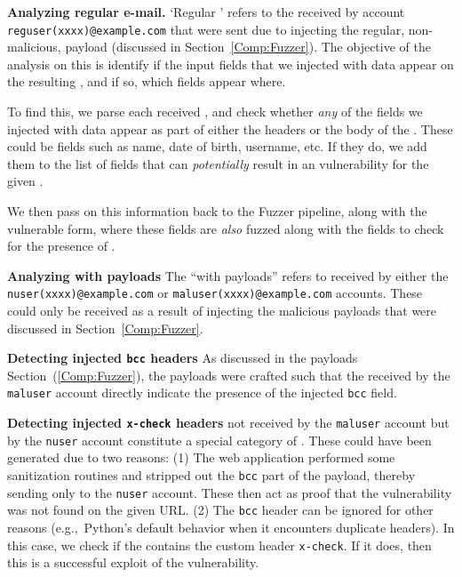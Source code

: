 \noindent\textbf{Analyzing regular e-mail.}
\sloppy
`Regular \email' refers to the \emails received by account {\lstinline{reguser(xxxx)@example.com}} that were sent due to injecting the regular, non-malicious, payload (discussed in Section~\ref{Comp:Fuzzer}). The objective of the analysis on this \email is identify if the input fields that we injected with data appear on the resulting \email, and if so, which fields appear where.

To find this, we parse each received \email, and check whether \emph{any} of the fields we injected with data appear as part of either the headers or the body of the \email. These could be fields such as name, date of birth, username, etc. If they do, we add them to the list of fields that can \emph{potentially} result in an \ehi vulnerability for the given \email. 

We then pass on this information back to the Fuzzer pipeline, along with the vulnerable form, where these fields are \emph{also} fuzzed along with the \email fields to check for the presence of \ehi.

\noindent\textbf{Analyzing \email with payloads}
The ``\emails with payloads'' refers to \emails received by either the {\lstinline{nuser(xxxx)@example.com}} or {\lstinline{maluser(xxxx)@example.com}} accounts. These \emails could only be received as a result of injecting the malicious payloads that were discussed in Section~\ref{Comp:Fuzzer}. 

\noindent\textbf{Detecting injected \texttt{bcc} headers}
As discussed in the payloads Section~(\ref{Comp:Fuzzer}), the payloads were crafted such that the \emails received by the \texttt{maluser} account directly indicate the presence of the injected \texttt{bcc} field. 

\label{analyze:detect_x_check}
\noindent\textbf{Detecting injected \texttt{x-check} headers} \Emails
not received by the \texttt{maluser} account but by the \texttt{nuser}
account constitute a special category of \emails. These \emails could
have been generated due to two reasons: (1) The web application
performed some sanitization routines and stripped out the \texttt{bcc}
part of the payload, thereby sending \emails only to the
\texttt{nuser} account. These \emails then act as proof that the
vulnerability was not found on the given URL. (2) The \texttt{bcc}
header can be ignored for other reasons (e.g.,\ Python's default
behavior when it encounters duplicate headers). In this case, we check
if the \email contains the custom header \texttt{x-check}. If it does,
then this is a successful exploit of the vulnerability.
